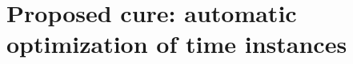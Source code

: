 \section{Proposed cure: automatic optimization of time instances} %
\label{sec:condition_solution}



